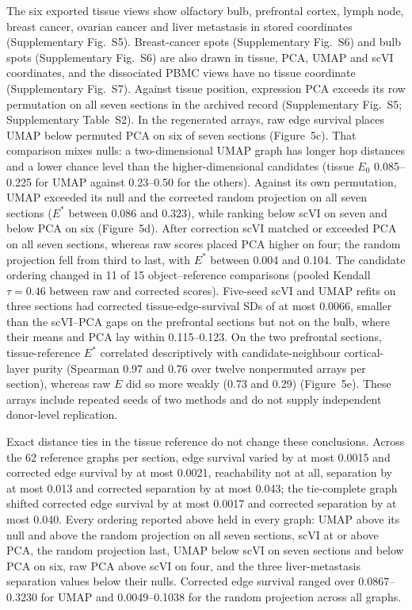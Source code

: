\documentclass[11pt]{article}
\begin{document}
The six exported tissue views show olfactory bulb, prefrontal cortex, lymph node, breast cancer, ovarian cancer and liver metastasis in stored coordinates (Supplementary Fig.~S5). Breast-cancer spots (Supplementary Fig.~S6) and bulb spots (Supplementary Fig.~S6) are also drawn in tissue, PCA, UMAP and scVI coordinates, and the dissociated PBMC views have no tissue coordinate (Supplementary Fig.~S7). Against tissue position, expression PCA exceeds its row permutation on all seven sections in the archived record (Supplementary Fig.~S5; Supplementary Table~S2). In the regenerated arrays, raw edge survival places UMAP below permuted PCA on six of seven sections (Figure~5c). That comparison mixes nulls: a two-dimensional UMAP graph has longer hop distances and a lower chance level than the higher-dimensional candidates (tissue $E_0$ 0.085--0.225 for UMAP against 0.23--0.50 for the others). Against its own permutation, UMAP exceeded its null and the corrected random projection on all seven sections ($E^*$ between 0.086 and 0.323), while ranking below scVI on seven and below PCA on six (Figure~5d). After correction scVI matched or exceeded PCA on all seven sections, whereas raw scores placed PCA higher on four; the random projection fell from third to last, with $E^*$ between 0.004 and 0.104. The candidate ordering changed in 11 of 15 object--reference comparisons (pooled Kendall $\tau=0.46$ between raw and corrected scores). Five-seed scVI and UMAP refits on three sections had corrected tissue-edge-survival SDs of at most 0.0066, smaller than the scVI--PCA gaps on the prefrontal sections but not on the bulb, where their means and PCA lay within 0.115--0.123. On the two prefrontal sections, tissue-reference $E^*$ correlated descriptively with candidate-neighbour cortical-layer purity (Spearman 0.97 and 0.76 over twelve nonpermuted arrays per section), whereas raw $E$ did so more weakly (0.73 and 0.29) (Figure~5e). These arrays include repeated seeds of two methods and do not supply independent donor-level replication.

Exact distance ties in the tissue reference do not change these conclusions. Across the 62 reference graphs per section, edge survival varied by at most 0.0015 and corrected edge survival by at most 0.0021, reachability not at all, separation by at most 0.013 and corrected separation by at most 0.043; the tie-complete graph shifted corrected edge survival by at most 0.0017 and corrected separation by at most 0.040. Every ordering reported above held in every graph: UMAP above its null and above the random projection on all seven sections, scVI at or above PCA, the random projection last, UMAP below scVI on seven sections and below PCA on six, raw PCA above scVI on four, and the three liver-metastasis separation values below their nulls. Corrected edge survival ranged over 0.0867--0.3230 for UMAP and 0.0049--0.1038 for the random projection across all graphs.
\end{document}
